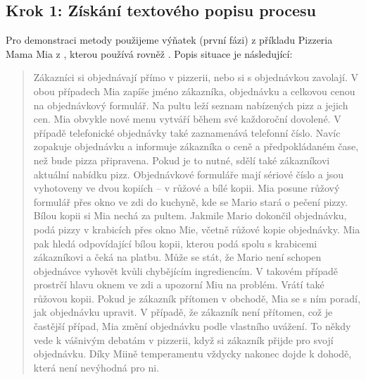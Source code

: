 \subsection{Krok 1: Získání textového popisu procesu}
Pro demonstraci metody použijeme výňatek (první fázi) z příkladu Pizzeria Mama Mia z \cite{Dietz2006}, kterou používá rovněž \cite{VanNuffel2009}. Popis situace je následující:
\begin{quote}
Zákazníci si objednávají přímo v pizzerii, nebo si s objednávkou zavolají. V obou případech Mia zapíše jméno zákazníka, objednávku a celkovou cenou na objednávkový formulář. Na pultu leží seznam nabízených pizz a jejich cen. Mia obvykle nové menu vytváří během své každoroční dovolené. V případě telefonické objednávky také zaznamenává telefonní číslo. Navíc zopakuje objednávku a informuje zákazníka o ceně a předpokládaném čase, než bude pizza připravena. Pokud je to nutné, sdělí také zákazníkovi aktuální  nabídku pizz. Objednávkové formuláře mají sériové číslo a jsou vyhotoveny ve dvou kopiích – v růžové a bílé kopii. Mia posune růžový formulář přes okno ve zdi do kuchyně, kde se Mario stará o pečení pizzy. Bílou kopii si Mia nechá za pultem. Jakmile Mario dokončil objednávku, podá pizzy v krabicích přes okno Mie, včetně růžové kopie objednávky. Mia pak hledá odpovídající bílou kopii, kterou podá spolu s krabicemi zákazníkovi a čeká na platbu. Může se stát, že Mario není schopen objednávce vyhovět kvůli chybějícím ingrediencím. V takovém případě prostrčí hlavu oknem ve zdi a upozorní Miu na problém. Vrátí také růžovou kopii. Pokud je zákazník přítomen v obchodě, Mia se s ním poradí, jak objednávku upravit. V případě, že zákazník není přítomen, což je častější případ, Mia změní objednávku podle vlastního uvážení. To někdy vede k vášnivým debatám v pizzerii, když si zákazník přijde pro svojí objednávku. Díky Miině temperamentu vždycky nakonec dojde k dohodě, která není nevýhodná pro ni.

\end{quote}
